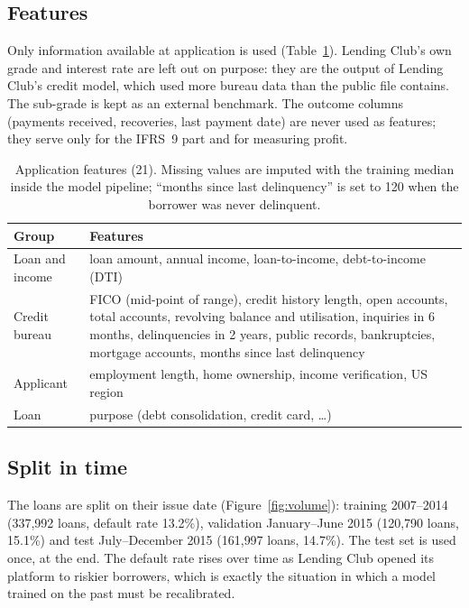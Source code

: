 \documentclass[11pt,a4paper]{article}
\begin{document}
\subsection{Features}
Only information available at application is used (Table~\ref{tab:features}). Lending Club's own grade and interest rate are left out on purpose: they are the output of Lending Club's credit model, which used more bureau data than the public file contains. The sub-grade is kept as an external benchmark. The outcome columns (payments received, recoveries, last payment date) are never used as features; they serve only for the IFRS~9 part and for measuring profit.

\begin{table}[H]
\centering
\small
\caption{Application features (21). Missing values are imputed with the training median inside the model pipeline; ``months since last delinquency'' is set to 120 when the borrower was never delinquent.}
\label{tab:features}
\begin{tabular}{lp{11.5cm}}
\toprule
Group & Features \\
\midrule
Loan and income & loan amount, annual income, loan-to-income, debt-to-income (DTI) \\
Credit bureau & FICO (mid-point of range), credit history length, open accounts, total accounts, revolving balance and utilisation, inquiries in 6 months, delinquencies in 2 years, public records, bankruptcies, mortgage accounts, months since last delinquency \\
Applicant & employment length, home ownership, income verification, US region \\
Loan & purpose (debt consolidation, credit card, \ldots) \\
\bottomrule
\end{tabular}
\end{table}

\subsection{Split in time}
The loans are split on their issue date (Figure~\ref{fig:volume}): training 2007--2014 (337{,}992 loans, default rate 13.2\%), validation January--June 2015 (120{,}790 loans, 15.1\%) and test July--December 2015 (161{,}997 loans, 14.7\%). The test set is used once, at the end. The default rate rises over time as Lending Club opened its platform to riskier borrowers, which is exactly the situation in which a model trained on the past must be recalibrated.
\end{document}
